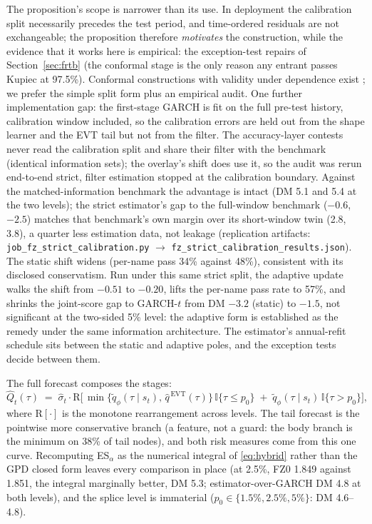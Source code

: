 \documentclass[11pt]{article}
\theoremstyle{remark}
\begin{document}
The proposition's scope is narrower than its use. In
deployment the calibration split necessarily precedes the test period,
and time-ordered residuals are not exchangeable; the proposition
therefore \emph{motivates} the construction, while the evidence that it works here is empirical: the exception-test repairs of
Section~\ref{sec:frtb} (the conformal stage is the only reason any
entrant passes Kupiec at 97.5\%). Conformal constructions with
validity under dependence exist \citep{chernozhukov2018conformal}; we
prefer the simple split form plus an empirical audit. One further
implementation gap: the first-stage
GARCH is fit on the full pre-test history, calibration window
included, so the calibration errors are held out from the shape
learner and the EVT tail but not from the filter. The accuracy-layer
contests never read the calibration split and share their filter with
the benchmark (identical information sets); the overlay's shift does
use it, so the audit was rerun end-to-end strict, filter estimation
stopped at the calibration boundary. Against the matched-information
benchmark the advantage is intact (DM 5.1 and 5.4 at the two levels);
the strict estimator's gap to the full-window benchmark ($-0.6$, $-2.5$)
matches that benchmark's own margin over its short-window twin (2.8, 3.8), a quarter less estimation data, not leakage (replication
artifacts: \texttt{job\_fz\_strict\_calibration.py} $\to$
\texttt{fz\_strict\_calibration\_results.json}). The static shift
widens (per-name pass 34\% against 48\%), consistent with its
disclosed conservatism. Run under this same strict split, the adaptive
update \citep{gibbs2021aci} walks the shift from $-0.51$ to $-0.20$,
lifts the per-name pass rate to 57\%, and shrinks the joint-score gap
to GARCH-$t$ from DM $-3.2$ (static) to $-1.5$, not significant at the
two-sided 5\% level: the adaptive form is established as the remedy
under the same information architecture. The estimator's annual-refit
schedule sits between the static and adaptive poles, and the exception
tests decide between them.

The full forecast composes the stages:
\begin{equation}
\widehat{Q}_t(\tau) \;=\; \widehat{\sigma}_t \cdot
\mathrm{R}\Big[\, \min\{\widetilde{q}_\phi(\tau \mid s_t),\,
\widehat{q}^{\,\mathrm{EVT}}(\tau)\}\,\mathbb{I}\{\tau \le p_0\}
\;+\; \widetilde{q}_\phi(\tau \mid s_t)\,\mathbb{I}\{\tau > p_0\}
\Big],
\label{eq:hybrid}
\end{equation}
where $\mathrm{R}[\cdot]$ is the monotone rearrangement across
levels. The tail forecast is the pointwise more conservative branch (a
feature, not a guard: the body branch is the minimum on 38\% of tail
nodes), and both risk measures come from this one curve. Recomputing
ES$_\alpha$ as the numerical integral of \eqref{eq:hybrid} rather than
the GPD closed form leaves every comparison in place (at 2.5\%, FZ0
1.849 against 1.851, the integral marginally better, DM 5.3;
estimator-over-GARCH DM 4.8 at both levels), and the splice level is
immaterial ($p_0\in\{1.5\%,2.5\%,5\%\}$: DM 4.6--4.8).
\end{document}
